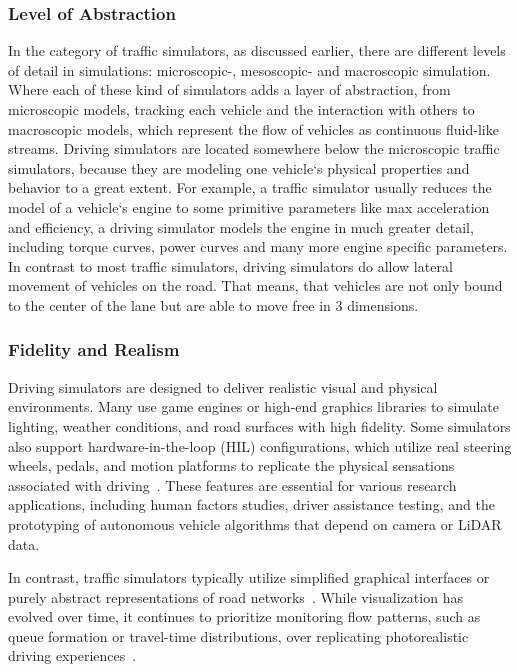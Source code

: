             \subsubsection{Level of Abstraction}
                In the category of traffic simulators, as discussed earlier, there are different levels of detail in simulations: microscopic-, mesoscopic- and macroscopic simulation.
                Where each of these kind of simulators adds a layer of abstraction, from microscopic models, tracking each vehicle and the interaction with others to macroscopic models, which represent the flow of vehicles as continuous fluid-like streams.
                Driving simulators are located somewhere below the microscopic traffic simulators, because they are modeling one vehicle`s physical properties and behavior to a great extent.
                For example, a traffic simulator usually reduces the model of a vehicle`s engine to some primitive parameters like max acceleration and efficiency, a driving simulator models the engine in much greater detail, including torque curves, power curves and many more engine specific parameters.
                In contrast to most traffic simulators, driving simulators do allow lateral movement of vehicles on the road.
                That means, that vehicles are not only bound to the center of the lane but are able to move free in 3 dimensions.

            \subsubsection{Fidelity and Realism}
                Driving simulators are designed to deliver realistic visual and physical environments.
                Many use game engines or high-end graphics libraries to simulate lighting, weather conditions, and road surfaces with high fidelity.
                Some simulators also support hardware-in-the-loop (HIL) configurations, which utilize real steering wheels, pedals, and motion platforms to replicate the physical sensations associated with driving~\cite{sievers2018driving}.
                These features are essential for various research applications, including human factors studies, driver assistance testing, and the prototyping of autonomous vehicle algorithms that depend on camera or LiDAR\cite{collis1970lidar} data.

                In contrast, traffic simulators typically utilize simplified graphical interfaces or purely abstract representations of road networks~\cite{Treiber2010}.
                While visualization has evolved over time, it continues to prioritize monitoring flow patterns, such as queue formation or travel-time distributions, over replicating photorealistic driving experiences~\cite{carla2017}.

